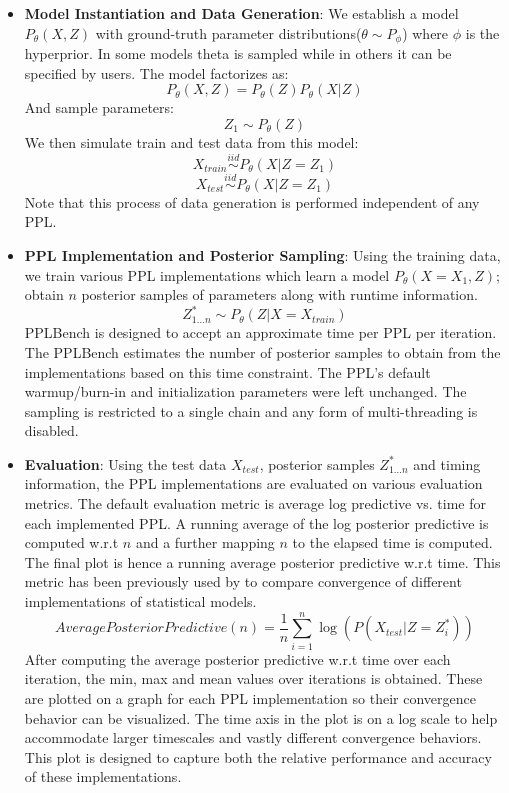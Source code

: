 \documentclass[main.tex]{subfiles}
\begin{document}
\begin{itemize}
\item \textbf{Model Instantiation and Data Generation}: We establish a model $P_\theta(X,Z)$ with ground-truth parameter distributions($\theta \sim P_\phi$) where $\phi$ is the hyperprior.
In some models theta is sampled while in others it can be specified by users. \newline
The model factorizes as:
$$
P_\theta(X,Z) = P_\theta(Z)P_\theta(X|Z)
$$
And sample parameters:
$$
Z_1 \sim P_\theta(Z)
$$
We then simulate train and test data from this model:
$$
X_{train} \stackrel{iid}{\sim} P_\theta(X|Z=Z_1)
$$
$$
X_{test} \stackrel{iid}{\sim} P_\theta(X|Z=Z_1)
$$
Note that this process of data generation is performed independent of any PPL.
\item \textbf{PPL Implementation and Posterior Sampling}: Using the training data, we train various PPL implementations which learn a model $P_\theta(X = X_1,Z)$; obtain $n$ posterior samples of parameters along with runtime information.
$$
Z^*_{1...n} \sim P_\theta(Z | X = X_{train})
$$
PPLBench is designed to accept an approximate time per PPL per iteration.
The PPLBench estimates the number of posterior samples to obtain from the implementations based on this time constraint.
The PPL’s default warmup/burn-in and initialization parameters were left unchanged.
The sampling is restricted to a single chain and any form of multi-threading is disabled.
\item \textbf{Evaluation}: Using the test data $X_{test}$, posterior samples $Z^*_{1...n}$ and timing information, the PPL implementations are evaluated on various evaluation metrics.
The default evaluation metric is average log predictive vs. time for each implemented PPL.
A running average of the log posterior predictive is computed w.r.t $n$ and a further mapping $n$ to the elapsed time is computed.
The final plot is hence a running average posterior predictive w.r.t time.
This metric has been previously used by \cite{kucukelbir2017automatic} to compare convergence of different implementations of statistical models.
$$
Average Posterior Predictive(n) = \frac{1}{n}\sum_{i=1}^{n}\log(P(X_{test}|Z=Z^*_{i}))
$$
After computing the average posterior predictive w.r.t time over each iteration, the min, max and mean values over iterations is obtained.
These are plotted on a graph for each PPL implementation so their convergence behavior can be visualized.
The time axis in the plot is on a log scale to help accommodate larger timescales and vastly different convergence behaviors.
This plot is designed to capture both the relative performance and accuracy of these implementations.
\end{itemize}
\end{document}
